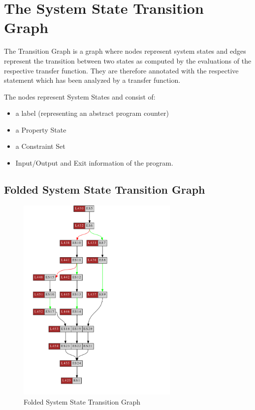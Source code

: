 \section{The System State Transition Graph}

\newcommand{\deqop}[0]{\#\#}
\newcommand{\eq}[0]{=}

The Transition Graph is a graph where nodes represent system states
and edges represent the transition between two states as computed by
the evaluations of the respective transfer function. They are
therefore annotated with the respective statement which has been
analyzed by a transfer function.

The nodes represent System States and consist of:
\begin{itemize}
  \item a label (representing an abstract program counter)
  \item a Property State
  \item a Constraint Set
  \item Input/Output and Exit information of the program.
 \end{itemize}

\subsection{Folded System State Transition Graph}

\begin{figure}[t]
\centering
\includegraphics[width=0.7\textwidth]{gfx/basictest15_transitiongraph2.pdf}
\caption{Folded System State Transition Graph}
\end{figure}

